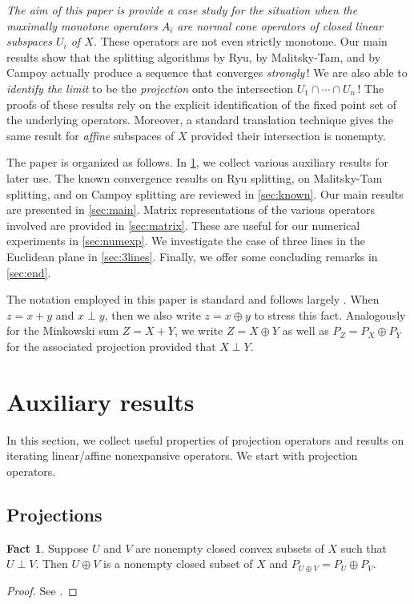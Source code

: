 \documentclass[11pt]{article}
\theoremstyle{definition}
\newtheorem{fact}[theorem]{Fact}
\begin{document}
{\emph{The aim of this paper is provide a case study for the situation
when the maximally monotone operators $A_i$ are normal cone operators 
of closed linear subspaces $U_i$ of $X$.}
These operators are not even strictly monotone. 
Our main results show that the splitting algorithms by Ryu,
by Malitsky-Tam, and by Campoy actually produce a sequence 
that converges \emph{strongly}\,! We are also able to \emph{identify the limit} to
be the \emph{projection} onto the intersection
$U_1\cap\cdots\cap U_n$\,!
The proofs of these results rely on the explicit identification of the fixed point
set of the underlying operators.
Moreover, a standard translation technique gives the same result for
\emph{affine} subspaces of $X$ provided their intersection is nonempty.

The paper is organized as follows.
In \cref{sec:aux}, we collect various auxiliary results for later use.
The known convergence results on Ryu splitting, on 
Malitsky-Tam splitting, and on Campoy splitting are reviewed in \cref{sec:known}.
Our main results are presented in \cref{sec:main}.
Matrix representations of the various operators involved
are provided in \cref{sec:matrix}. 
These are useful for our numerical experiments in \cref{sec:numexp}.
{\color{black} We investigate the case of three lines in 
the Euclidean plane in \cref{sec:3lines}.}
Finally, we offer some concluding remarks in \cref{sec:end}. 


The notation employed in this paper is 
standard and follows largely \cite{BC2017}. 
When $z=x+y$ and $x\perp y$, then we also write
$z=x\oplus y$ to stress this fact.
Analogously for the Minkowski sum $Z=X+Y$, we
write $Z= X\oplus Y$ as well as $P_Z = P_X\oplus P_Y$ for the 
associated projection provided that $X\perp Y$.

\section{Auxiliary results}
\label{sec:aux}

In this section, we collect useful properties of projection operators
and results on iterating linear/affine nonexpansive operators. 
We start with projection operators.

\subsection{Projections}

\begin{fact}
\label{f:orthoP}
Suppose $U$ and $V$ are nonempty closed convex subsets of $X$ such that
$U\perp V$. Then
$U\oplus V$ is a nonempty closed subset of $X$ and 
$P_{U\oplus V} = P_U\oplus P_V$. 
\end{fact}
\begin{proof}
See \cite[Proposition~29.6]{BC2017}. 
\end{proof}

}
\end{document}
